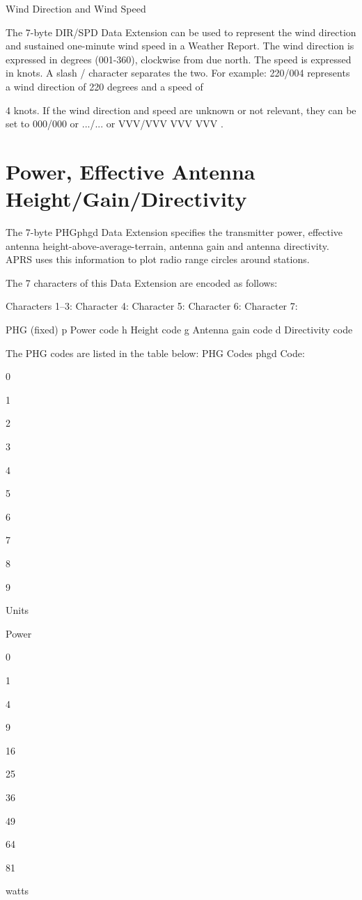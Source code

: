 Wind Direction
and Wind Speed

The 7-byte DIR/SPD Data Extension can be used to represent the wind
direction and sustained one-minute wind speed in a Weather Report.
The wind direction is expressed in degrees (001-360), clockwise from due
north. The speed is expressed in knots. A slash / character separates the two.
For example:
220/004 represents a wind direction of 220 degrees and a speed of

4 knots.
If the wind direction and speed are unknown or not relevant, they can be set
to 000/000 or .../... or VVV/VVV
VVV VVV .


\section{Power, Effective Antenna Height/Gain/Directivity}


The 7-byte PHGphgd Data Extension specifies the transmitter power,
effective antenna height-above-average-terrain, antenna gain and antenna
directivity. APRS uses this information to plot radio range circles around
stations.


The 7 characters of this Data Extension are encoded as follows:

Characters 1–3:
Character 4:
Character 5:
Character 6:
Character 7:

PHG (fixed)
p Power code
h Height code
g Antenna gain code
d Directivity code

The PHG codes are listed in the table below:
PHG Codes
phgd Code:

0

1

2

3

4

5

6

7

8

9

Units

Power

0

1

4

9

16

25

36

49

64

81

watts

